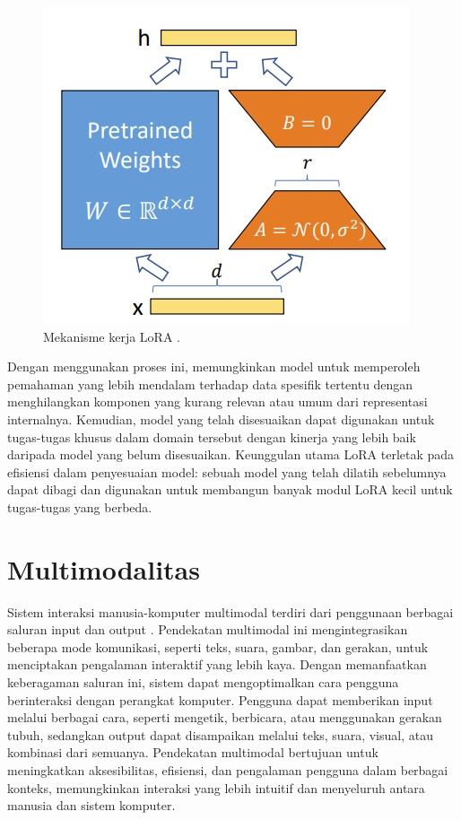 \begin{figure}[H]
  \centering

  \includegraphics[scale=0.8]{gambar/lora.jpg}

  \caption{Mekanisme kerja LoRA \parencite{gemma}.}
\end{figure}

Dengan menggunakan proses ini, memungkinkan model untuk memperoleh pemahaman yang lebih mendalam terhadap data spesifik tertentu dengan menghilangkan komponen yang kurang relevan atau umum dari representasi internalnya. Kemudian, model yang telah disesuaikan dapat digunakan untuk tugas-tugas khusus dalam domain tersebut dengan kinerja yang lebih baik daripada model yang belum disesuaikan. Keunggulan utama LoRA terletak pada efisiensi dalam penyesuaian model: sebuah model yang telah dilatih sebelumnya dapat dibagi dan digunakan untuk membangun banyak modul LoRA kecil untuk tugas-tugas yang berbeda. 


\section{Multimodalitas}
\label{sec:gravitasi}

Sistem interaksi manusia-komputer multimodal terdiri dari penggunaan berbagai saluran input dan output \parencite{jia2020multimodal}. Pendekatan multimodal ini mengintegrasikan beberapa mode komunikasi, seperti teks, suara, gambar, dan gerakan, untuk menciptakan pengalaman interaktif yang lebih kaya. Dengan memanfaatkan keberagaman saluran ini, sistem dapat mengoptimalkan cara pengguna berinteraksi dengan perangkat komputer. Pengguna dapat memberikan input melalui berbagai cara, seperti mengetik, berbicara, atau menggunakan gerakan tubuh, sedangkan output dapat disampaikan melalui teks, suara, visual, atau kombinasi dari semuanya. Pendekatan multimodal bertujuan untuk meningkatkan aksesibilitas, efisiensi, dan pengalaman pengguna dalam berbagai konteks, memungkinkan interaksi yang lebih intuitif dan menyeluruh antara manusia dan sistem komputer.

